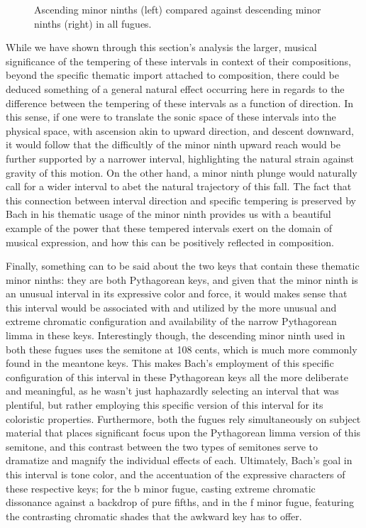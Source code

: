 \begin{figure}[H]
\vspace{1.5em}
    \centering
    \caption[Ascending minor ninths compared against descending minor ninths in all fugues. ]{Ascending minor ninths (left) compared against descending minor ninths (right) in all fugues.}
\end{figure}    While we have shown through this section's analysis the larger, musical
significance of the tempering of these intervals in context of their
compositions, beyond the specific thematic import attached to
composition, there could be deduced something of a general natural
effect occurring here in regards to the difference between the tempering
of these intervals as a function of direction. In this sense, if one
were to translate the sonic space of these intervals into the physical
space, with ascension akin to upward direction, and descent downward, it
would follow that the difficultly of the minor ninth upward reach would
be further supported by a narrower interval, highlighting the natural
strain against gravity of this motion. On the other hand, a minor ninth
plunge would naturally call for a wider interval to abet the natural
trajectory of this fall. The fact that this connection between interval
direction and specific tempering is preserved by Bach in his thematic
usage of the minor ninth provides us with a beautiful example of the
power that these tempered intervals exert on the domain of musical
expression, and how this can be positively reflected in composition.

Finally, something can to be said about the two keys that contain these
thematic minor ninths: they are both Pythagorean keys, and given that
the minor ninth is an unusual interval in its expressive color and
force, it would makes sense that this interval would be associated with
and utilized by the more unusual and extreme chromatic configuration and
availability of the narrow Pythagorean limma in these keys.
Interestingly though, the descending minor ninth used in both these
fugues uses the semitone at 108 cents, which is much more commonly found
in the meantone keys. This makes Bach's employment of this specific
configuration of this interval in these Pythagorean keys all the more
deliberate and meaningful, as he wasn't just haphazardly selecting an
interval that was plentiful, but rather employing this specific version
of this interval for its coloristic properties. Furthermore, both the
fugues rely simultaneously on subject material that places significant
focus upon the Pythagorean limma version of this semitone, and this
contrast between the two types of semitones serve to dramatize and
magnify the individual effects of each. Ultimately, Bach's goal in this
interval is tone color, and the accentuation of the expressive
characters of these respective keys; for the b minor fugue, casting
extreme chromatic dissonance against a backdrop of pure fifths, and in
the f minor fugue, featuring the contrasting chromatic shades that the
awkward key has to offer.

